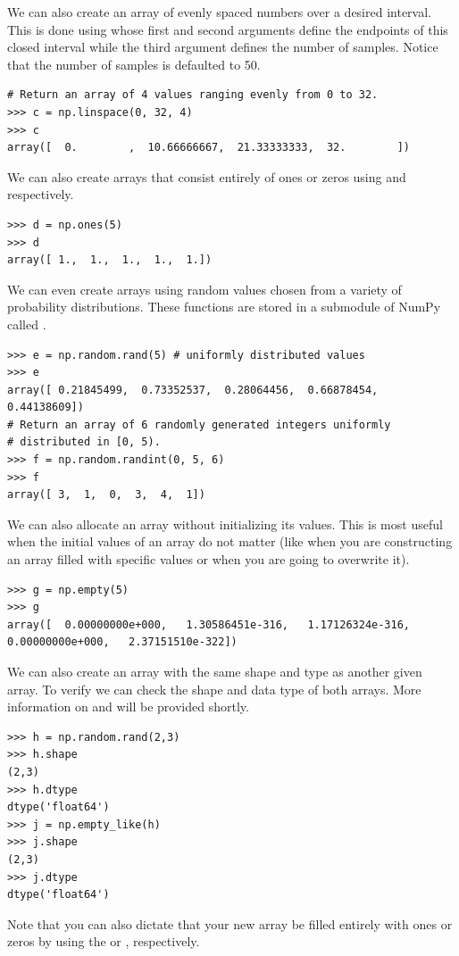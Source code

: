 We can also create an array of evenly spaced numbers over a desired interval.
This is done using  whose first
and second arguments define the endpoints of this closed interval while 
the third argument defines the number of samples. Notice that the number
of samples is defaulted to 50. 
\begin{lstlisting}
# Return an array of 4 values ranging evenly from 0 to 32.
>>> c = np.linspace(0, 32, 4) 
>>> c
array([  0.        ,  10.66666667,  21.33333333,  32.        ])
\end{lstlisting} 


We can also create arrays that
consist entirely of ones or zeros using  and
 respectively. 
\begin{lstlisting}
>>> d = np.ones(5) 
>>> d
array([ 1.,  1.,  1.,  1.,  1.])
\end{lstlisting} 

We can even create arrays using random values chosen
from a variety of probability distributions. These functions are stored
in a submodule of NumPy called . 
\begin{lstlisting}
>>> e = np.random.rand(5) # uniformly distributed values 
>>> e
array([ 0.21845499,  0.73352537,  0.28064456,  0.66878454,  0.44138609])
# Return an array of 6 randomly generated integers uniformly
# distributed in [0, 5).
>>> f = np.random.randint(0, 5, 6) 
>>> f
array([ 3,  1,  0,  3,  4,  1])

\end{lstlisting} 

We can also allocate an array without initializing its
values. This is most useful when the initial values of an
array do not matter (like when you are constructing an array filled with
specific values or when you are going to overwrite it).
\begin{lstlisting}
>>> g = np.empty(5) 
>>> g
array([  0.00000000e+000,   1.30586451e-316,   1.17126324e-316,
0.00000000e+000,   2.37151510e-322]) 
\end{lstlisting} 

We can also create an array with the same shape and type as another given array. 
To verify we can check the shape and data type of both arrays. More information
on  and  will be provided shortly.
\begin{lstlisting}
>>> h = np.random.rand(2,3) 
>>> h.shape
(2,3)
>>> h.dtype
dtype('float64')
>>> j = np.empty_like(h)
>>> j.shape
(2,3)
>>> j.dtype
dtype('float64')
\end{lstlisting} 
Note that you can also dictate that your new array be
filled entirely with ones or zeros by using the  or
, respectively.


